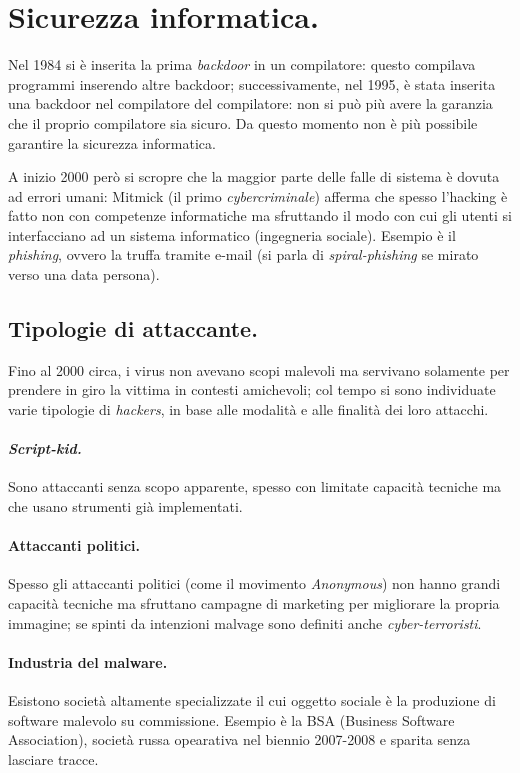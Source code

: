 \documentclass[a4page, 11pt, twocolumn]{article}
\begin{document}
\section{Sicurezza informatica.}
Nel 1984 si è inserita la prima \textit{backdoor} in un compilatore: questo compilava programmi inserendo altre backdoor; successivamente, nel 1995, è stata inserita una backdoor nel compilatore del compilatore: non si può più avere la garanzia che il proprio compilatore sia sicuro.
Da questo momento non è più possibile garantire la sicurezza informatica.

A inizio 2000 però si scropre che la maggior parte delle falle di sistema è dovuta ad errori umani: Mitmick (il primo \textit{cybercriminale}) afferma che spesso l'hacking è fatto non con competenze informatiche ma sfruttando il modo con cui gli utenti si interfacciano ad un sistema informatico (ingegneria sociale).
Esempio è il \textit{phishing}, ovvero la truffa tramite e-mail (si parla di \textit{spiral-phishing} se mirato verso una data persona). \newline

\subsection{Tipologie di attaccante.}
Fino al 2000 circa, i virus non avevano scopi malevoli ma servivano solamente per prendere in giro la vittima in contesti amichevoli; col tempo si sono individuate varie tipologie di \textit{hackers}, in base alle modalità e alle finalità dei loro attacchi.

\paragraph{\textit{Script-kid.}} Sono attaccanti senza scopo apparente, spesso con limitate capacità tecniche ma che usano strumenti già implementati.
\paragraph{Attaccanti politici.} Spesso gli attaccanti politici (come il movimento \textit{Anonymous}) non hanno grandi capacità tecniche ma sfruttano campagne di marketing per migliorare la propria immagine; se spinti da intenzioni malvage sono definiti anche \textit{cyber-terroristi}.
\paragraph{Industria del malware.} Esistono società altamente specializzate il cui oggetto sociale è la produzione di software malevolo su commissione.
Esempio è la BSA (Business Software Association), società russa opearativa nel biennio 2007-2008 e sparita senza lasciare tracce.
\end{document}
